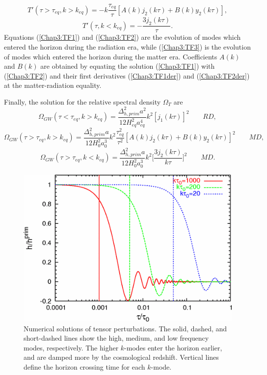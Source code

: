 \documentclass[11pt,a4paper,twoside]{book}
\begin{document}
\begin{equation}
	\label{Chap3:TF2der}
	T'(\tau > \tau_{eq},k > k_{eq}) = -k\frac{\tau_{eq}}{\tau}[A(k)j_{2}(k\tau) + B(k)y_{2}(k\tau)],
\end{equation}
\begin{equation}
	\label{Chap3:TF3der}
	T'(\tau,k < k_{eq}) = -\frac{3j_{2}(k\tau)}{\tau}.
\end{equation}
Equations (\ref{Chap3:TF1}) and (\ref{Chap3:TF2}) are the evolution of modes which entered the horizon during the radiation era, while (\ref{Chap3:TF3}) is the evolution of modes which entered the horizon during the matter era. Coefficients $ A(k) $ and $ B(k) $ are obtained by equating the solution (\ref{Chap3:TF1}) with (\ref{Chap3:TF2}) and their first derivatives (\ref{Chap3:TF1der}) and (\ref{Chap3:TF2der}) at the matter-radiation equality.

Finally, the solution for the relative spectral density $ \Omega_{T} $ are
\begin{equation}
	\label{Chap3:Omega1}
	\Omega_{GW}(\tau < \tau_{eq},k > k_{eq}) = \frac{\Delta_{h,prim}^{2}a^{2}}{12H^{2}_{eq}a^{4}_{eq}}k^{2}[j_{1}(k\tau)]^{2}
	\qquad
	RD,
\end{equation}
\begin{equation}
	\label{Chap3:Omega2}
		\Omega_{GW}(\tau > \tau_{eq},k > k_{eq}) = \frac{\Delta_{h,prim}^{2}a}{12H_{0}^{2}a_{0}^{3}}k^{2}\frac{\tau_{eq}^{2}}{\tau^{2}}[A(k)j_{2}(k\tau) + B(k)y_{2}(k\tau)]^{2}
		\qquad
		MD,
\end{equation}
\begin{equation}
	\label{Chap3:Omega3}
	\Omega_{GW}(\tau > \tau_{eq},k < k_{eq}) = \frac{\Delta_{h,prim}^{2}a}{12H_{0}^{2}a_{0}^{3}}k^{2}\Big [\frac{3j_{2}(k\tau)}{k\tau} \Big ]^{2}
	\qquad
	MD.
\end{equation}

\begin{figure}
	\centering
	\includegraphics[width=0.7\linewidth, height=0.25\textheight]{Images/Chap3/Watanabe_Komatsu_Fig6}
	\caption{Numerical solutions of tensor perturbations. The solid, dashed, and short-dashed lines show the high, medium, and low frequency modes, respectively. The higher $k$-modes enter the horizon earlier, and are damped more by the cosmological redshift. Vertical lines define the horizon crossing time for each $ k $-mode\cite{Chap3:GW_Watanabe_Komatsu}.}
	\label{fig:watanabekomatsufig6}
\end{figure}
\end{document}
